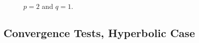 \newpage

\vspace*{\fill}
\begin{figure}[!ht]
    \begin{subfigure}[t]{0.49\textwidth}
        \centering
        
        \label{graph:2_1_par_l2l2}
    \end{subfigure}
    \hfill
    \begin{subfigure}[t]{0.49\textwidth}
        \centering
        
        \label{graph:2_1_par_l2h1}
    \end{subfigure}
    \par\bigskip
    \begin{subfigure}[t]{0.49\textwidth}
        \centering
        
        \label{graph:2_1_par_l2T}
    \end{subfigure}
    \hfill
    \begin{subfigure}[t]{0.49\textwidth}
        \centering
        
        \label{graph:2_1_par_linfl2}
    \end{subfigure}
    \caption{$p = 2$ and $q = 1$.}
\end{figure}
\vspace*{\fill}

\newpage
\subsection{Convergence Tests, Hyperbolic Case} \label{sec:graphs_2}


